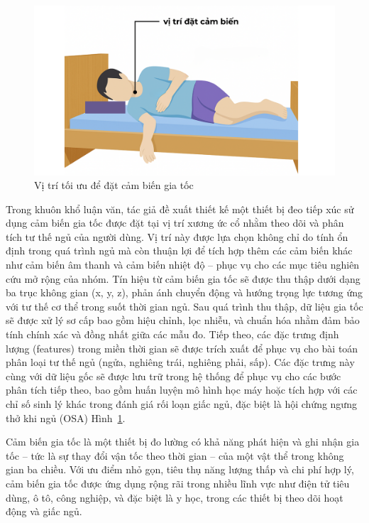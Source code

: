 \begin{figure}[!ht]
		\centering
 		\includegraphics[width=\textwidth]{images/vị trí đặt cảm biến.png}
 		\vspace*{-7mm}
		\caption{Vị trí tối ưu để đặt cảm biến gia tốc}
		\label{position_sensor}
\end{figure}

Trong khuôn khổ luận văn, tác giả đề xuất thiết kế một thiết bị đeo 
tiếp xúc sử dụng cảm biến gia tốc được đặt tại vị trí xương ức cổ 
nhằm theo dõi và phân tích tư thế ngủ của người dùng. 
Vị trí này được lựa chọn không chỉ do tính ổn định trong 
quá trình ngủ mà còn thuận lợi để tích hợp thêm các cảm biến 
khác như cảm biến âm thanh và cảm biến nhiệt độ – phục vụ cho các mục tiêu nghiên 
cứu mở rộng của nhóm. Tín hiệu từ cảm biến gia tốc sẽ được 
thu thập dưới dạng ba trục không gian (x, y, z), phản ánh chuyển động và 
hướng trọng lực tương ứng với tư thế cơ thể trong suốt thời gian ngủ. 
Sau quá trình thu thập, dữ liệu gia tốc sẽ được xử lý sơ cấp bao gồm hiệu chỉnh, 
lọc nhiễu, và chuẩn hóa nhằm đảm bảo tính chính xác và đồng nhất giữa các mẫu đo. 
Tiếp theo, các đặc trưng định lượng (features) trong miền thời gian 
sẽ được trích xuất để phục vụ cho bài toán phân loại tư thế ngủ (ngửa, nghiêng trái, nghiêng phải, sấp). 
Các đặc trưng này cùng với dữ liệu gốc sẽ được lưu trữ trong hệ thống để phục vụ cho các bước phân tích tiếp theo, 
bao gồm huấn luyện mô hình học máy hoặc tích hợp với các chỉ số sinh lý khác trong đánh giá rối loạn giấc ngủ, 
đặc biệt là hội chứng ngưng thở khi ngủ (OSA) Hình~\ref{position_sensor}.

Cảm biến gia tốc là một thiết bị đo lường có khả năng phát hiện 
và ghi nhận gia tốc – tức là sự thay đổi vận tốc theo thời gian – 
của một vật thể trong không gian ba chiều. 
Với ưu điểm nhỏ gọn, tiêu thụ năng lượng thấp và chi phí hợp lý, 
cảm biến gia tốc được ứng dụng rộng rãi trong nhiều lĩnh vực 
như điện tử tiêu dùng, ô tô, công nghiệp, và đặc biệt là y học, 
trong các thiết bị theo dõi hoạt động và giấc ngủ.

